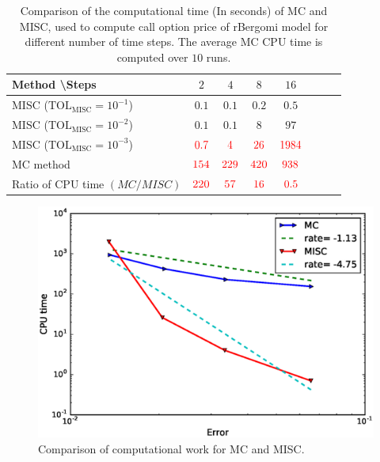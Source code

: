 \FloatBarrier
\begin{table}[h!]
	\centering
	\begin{tabular}{l*{6}{c}r}
		Method \textbackslash  Steps            & $2$ & $4$ & $8$ & $16$ &   \\
		\hline
		MISC ($\text{TOL}_{\text{MISC}}=10^{-1}$)  & $0.1$ & $0.1$ & $0.2$ & $0.5$ \\
		MISC ($\text{TOL}_{\text{MISC}}=10^{-2}$)  & $0.1$ & $0.1$ & $8$ & $97$ \\
		MISC ($\text{TOL}_{\text{MISC}}=10^{-3}$)  & $\red{0.7}$ & $\red{4}$ & $\red{26}$ & $\red{1984}$ \\
		\hline
		MC method   & $ \red{154}
		
		$  & $  \red{229}$  & $  \red{420}$ & $ \red{938}
		$  \\	
		\hline
		Ratio of CPU time  $\left(MC/MISC \right)$ & $ \red{   220}
		
		$  & $  \red{
		 57
		}$  & $  \red{    16
		}$ & $ \red{ 0.5}
		$  \\	
				
		\hline
	\end{tabular}
	\caption{Comparison of the computational time (In seconds) of  MC and MISC, used to compute call option price of rBergomi model for different number of time steps. The average  MC CPU time is computed over $10$ runs. }
	\label{Comparsion of the computational time of  MC and MISC, used to compute Call option price of rBergomi model for different number of time steps. Case set5}
\end{table}

\FloatBarrier


	\begin{figure}[h!]
	\centering
	\includegraphics[width=0.5\linewidth]{./figures/rBergomi_Complexity_rates/set7/error_vs_time_set7}
	
	\caption{Comparison of computational work for MC and MISC.}
	\label{fig:Complexity plot for MC and MISC for Case set $5$ parameters}
\end{figure}
\FloatBarrier




